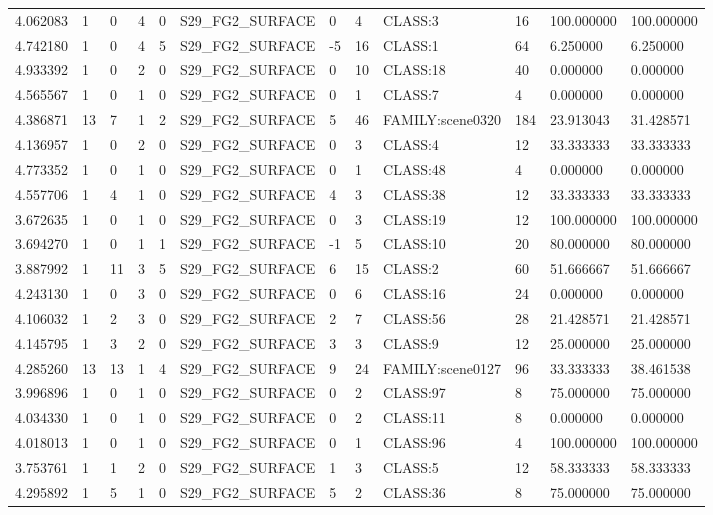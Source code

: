 \begin{tabular}{llllllllllll}
4.062083 & 1 & 0 & 4 & 0 & S29\_FG2\_SURFACE & 0 & 4 & CLASS:3 & 16 & 100.000000 & 100.000000 \\
4.742180 & 1 & 0 & 4 & 5 & S29\_FG2\_SURFACE & -5 & 16 & CLASS:1 & 64 & 6.250000 & 6.250000 \\
4.933392 & 1 & 0 & 2 & 0 & S29\_FG2\_SURFACE & 0 & 10 & CLASS:18 & 40 & 0.000000 & 0.000000 \\
4.565567 & 1 & 0 & 1 & 0 & S29\_FG2\_SURFACE & 0 & 1 & CLASS:7 & 4 & 0.000000 & 0.000000 \\
4.386871 & 13 & 7 & 1 & 2 & S29\_FG2\_SURFACE & 5 & 46 & FAMILY:scene0320 & 184 & 23.913043 & 31.428571 \\
4.136957 & 1 & 0 & 2 & 0 & S29\_FG2\_SURFACE & 0 & 3 & CLASS:4 & 12 & 33.333333 & 33.333333 \\
4.773352 & 1 & 0 & 1 & 0 & S29\_FG2\_SURFACE & 0 & 1 & CLASS:48 & 4 & 0.000000 & 0.000000 \\
4.557706 & 1 & 4 & 1 & 0 & S29\_FG2\_SURFACE & 4 & 3 & CLASS:38 & 12 & 33.333333 & 33.333333 \\
3.672635 & 1 & 0 & 1 & 0 & S29\_FG2\_SURFACE & 0 & 3 & CLASS:19 & 12 & 100.000000 & 100.000000 \\
3.694270 & 1 & 0 & 1 & 1 & S29\_FG2\_SURFACE & -1 & 5 & CLASS:10 & 20 & 80.000000 & 80.000000 \\
3.887992 & 1 & 11 & 3 & 5 & S29\_FG2\_SURFACE & 6 & 15 & CLASS:2 & 60 & 51.666667 & 51.666667 \\
4.243130 & 1 & 0 & 3 & 0 & S29\_FG2\_SURFACE & 0 & 6 & CLASS:16 & 24 & 0.000000 & 0.000000 \\
4.106032 & 1 & 2 & 3 & 0 & S29\_FG2\_SURFACE & 2 & 7 & CLASS:56 & 28 & 21.428571 & 21.428571 \\
4.145795 & 1 & 3 & 2 & 0 & S29\_FG2\_SURFACE & 3 & 3 & CLASS:9 & 12 & 25.000000 & 25.000000 \\
4.285260 & 13 & 13 & 1 & 4 & S29\_FG2\_SURFACE & 9 & 24 & FAMILY:scene0127 & 96 & 33.333333 & 38.461538 \\
3.996896 & 1 & 0 & 1 & 0 & S29\_FG2\_SURFACE & 0 & 2 & CLASS:97 & 8 & 75.000000 & 75.000000 \\
4.034330 & 1 & 0 & 1 & 0 & S29\_FG2\_SURFACE & 0 & 2 & CLASS:11 & 8 & 0.000000 & 0.000000 \\
4.018013 & 1 & 0 & 1 & 0 & S29\_FG2\_SURFACE & 0 & 1 & CLASS:96 & 4 & 100.000000 & 100.000000 \\
3.753761 & 1 & 1 & 2 & 0 & S29\_FG2\_SURFACE & 1 & 3 & CLASS:5 & 12 & 58.333333 & 58.333333 \\
4.295892 & 1 & 5 & 1 & 0 & S29\_FG2\_SURFACE & 5 & 2 & CLASS:36 & 8 & 75.000000 & 75.000000 \\

\end{tabular}

